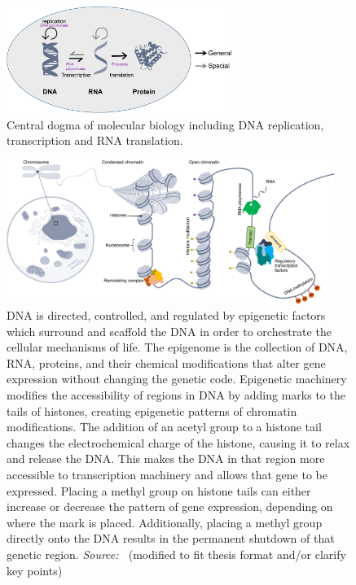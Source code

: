 \begin{figure}[!ht]
	\centering
	\includegraphics[width=0.65\textwidth]{central_dogma/fig}
	\vspace{0.1cm}
	\caption[central dogma.]{Central dogma of molecular biology including DNA replication, transcription and RNA translation.} 
	\label{fig:central_dogma}
\end{figure}



\begin{figure}[!ht]
	\centering
	\includegraphics[width=0.95\textwidth]{chromatin_organization/fig}
	\vspace{0.1cm}
	\caption[DNA organization] {DNA is directed, controlled, and regulated by epigenetic factors which surround and scaffold the DNA in order to orchestrate the cellular mechanisms of life. The epigenome is the collection of DNA, RNA, proteins, and their chemical modifications that alter gene expression without changing the genetic code. Epigenetic machinery modifies the accessibility of regions in DNA by adding marks to the tails of histones, creating epigenetic patterns of chromatin modifications. The addition of an acetyl group to a histone tail changes the electrochemical charge of the histone, causing it to relax and release the DNA. This makes the DNA in that region more accessible to transcription machinery and allows that gene to be expressed. Placing a methyl group on histone tails can either increase or decrease the pattern of gene expression, depending on where the mark is placed. Additionally, placing a methyl group directly onto the DNA results in the permanent shutdown of that genetic region. \emph{Source: ~\citep{heumos2023best}}(modified to fit thesis format and/or clarify key points)}
	\label{fig:chromatin_organization}
\end{figure}


